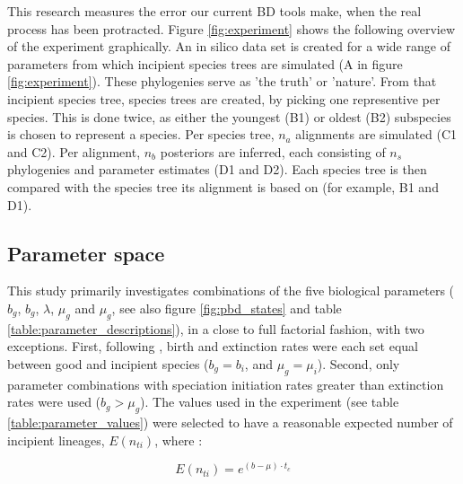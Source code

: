 \documentclass{article}
\begin{document}
This research measures the error our current BD tools make, when
the real process has been protracted. Figure \ref{fig:experiment} shows
the following overview of the experiment graphically.
 An in silico data set is created for a wide
range of parameters from which incipient species trees are simulated (A in figure \ref{fig:experiment}). 
These phylogenies serve as 'the truth' or 'nature'. From that incipient species tree,
species trees are created, by picking one representive per species.
This is done twice, as either the youngest (B1) or oldest (B2) subspecies is chosen
to represent a species. Per species tree, $n_a$ alignments are simulated (C1 and C2).
Per alignment, $n_b$ posteriors are inferred, 
each consisting of $n_s$ phylogenies and parameter estimates (D1 and D2). Each
species tree is then compared with the species tree its alignment is based on (for
example, B1 and D1).

\subsection{Parameter space}
\label{subsec:parameter_space}





This study primarily investigates combinations of the five biological 
parameters ($b_g$, $b_g$, $\lambda$, $\mu_g$ and $\mu_g$, 
see also figure \ref{fig:pbd_states} and table \ref{table:parameter_descriptions}), 
in a close to full factorial fashion, with two exceptions.
First, following \cite{etienne2014estimating}, birth and extinction rates were each 
set equal between good and incipient species ($b_g = b_i$, and $\mu_g = \mu_i$).
Second, only parameter combinations with speciation initiation rates greater
than extinction rates were used ($b_g > \mu_g$). The values 
used in the experiment (see table \ref{table:parameter_values}) 
were selected to have a reasonable expected number of incipient 
lineages, $E(n_{ti})$, where : 

\begin{equation}
  E(n_{ti}) = e^{ (b - \mu) \cdot t_c }
\end{equation}
\end{document}
